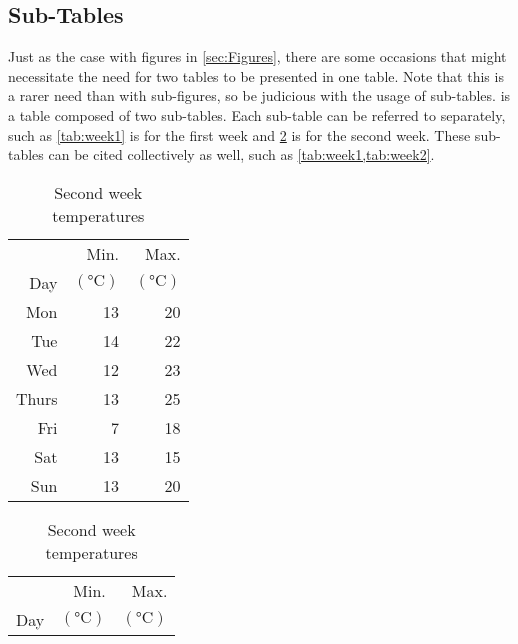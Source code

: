 \subsection{Sub-Tables}
    Just as the case with figures in \cref{sec:Figures}, there are some occasions that might necessitate the need for two tables to be presented in one table.
    Note that this is a rarer need than with sub-figures, so be judicious with the usage of sub-tables.
     is a table composed of two sub-tables.
    Each sub-table can be referred to separately, such as \cref{tab:week1} is for the first week and \cref{tab:week2} is for the second week.
    These sub-tables can be cited collectively as well, such as \cref{tab:week1,tab:week2}.
    \begin{table}
        \begin{subtable}[h]{0.375\textwidth}
            \centering
            \caption{First week temperatures}
            \label{tab:week1}
            \begin{tabular}{r r r}
                      & Min.  & Max. \\
                Day   & $\left(\unit{\degreeCelsius}\right)$
                              & $\left(\unit{\degreeCelsius}\right)$ \\
                \hline
                Mon   & 13 & 20 \\
                Tue   & 14 & 22 \\
                Wed   & 12 & 23 \\
                Thurs & 13 & 25 \\
                Fri   & 7  & 18 \\
                Sat   & 13 & 15 \\
                Sun   & 13 & 20 \\
                \hline
            \end{tabular}
        \end{subtable}
        \hspace{0.2in}
        \begin{subtable}[h]{0.375\textwidth}
            \caption{Second week temperatures}
            \label{tab:week2}
            \centering
            \begin{tabular}{r r r}
                      & Min.  & Max. \\
                Day   & $\left(\unit{\degreeCelsius}\right)$
                              & $\left(\unit{\degreeCelsius}\right)$ \\
                \hline

\end{tabular}
\end{subtable}
\end{table}
